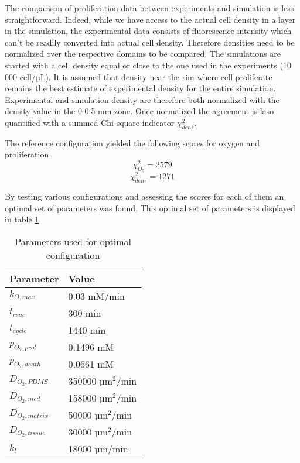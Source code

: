 \documentclass[11pt,a4paper]{article}
\begin{document}
The comparison of proliferation data between experiments and simulation is less straightforward. Indeed, while we have access to the actual cell density in a layer in the simulation, the experimental data consists of fluorescence intensity which can't be readily converted into actual cell density.  Therefore densities need to be normalized over the respective domains to be compared. The simulations are started with a cell density equal or close to the one used in the experiments (10 000 cell/µL). It is assumed that density near the rim where cell proliferate remains the best estimate of experimental density for the entire simulation. Experimental and simulation density are therefore both normalized with the density value in the 0-0.5 mm zone. Once normalized the agreement is laso quantified with a summed Chi-square indicator $\chi_{dens}^2$.

The reference configuration yielded the following scores for oxygen and proliferation
\[ \chi^2_{O_2} = 2579 \]
\[ \chi^2_{dens} =  1271 \]


By testing various configurations and assessing the scores for each of them an optimal set of parameters was found. This  optimal set of parameters is displayed  in table \ref{tab:2}.

\begin{table}[ht]
\begin{center}
\begin{tabular}{ |p{25mm}|p{30mm}| }
\hline
 \textbf{Parameter}  & \textbf{Value}\\
 \hline
  \hline
 $k_{O,max}$ & 0.03 mM/min \\
  \hline
 $t_{reac}$ & 300 min \\ 
  \hline
   $t_{cycle}$ & 1440 min  \\
 \hline 
 $p_{O_2,prol}$ & 0.1496 mM \\
  \hline
 $p_{O_2,death}$ & 0.0661 mM \\
 \hline
 $D_{O_2,PDMS}$ & 350000 µm$^2$/min  \\
 \hline 
  $D_{O_2,med}$ & 158000 µm$^2$/min   \\
 \hline 
  $D_{O_2,matrix}$ & 50000 µm$^2$/min  \\
 \hline  
  $D_{O_2,tissue}$ & 30000 µm$^2$/min \\
  \hline
  $k_{l}$ & 18000 µm/min  \\
  \hline
\end{tabular}
\caption{Parameters used for optimal configuration \label{tab:2}}
\end{center}
\end{table}
\end{document}
